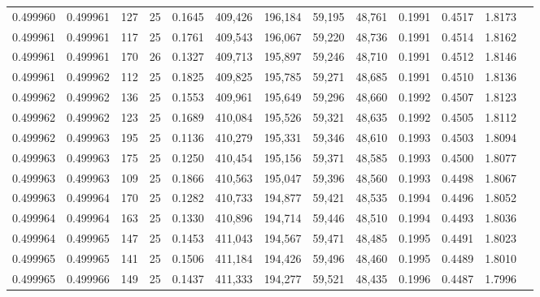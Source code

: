 \begin{tabular}{rrrrrrrrrrrrr}
0.499960 & 0.499961 & 127 &  25 &                                     0.1645 & 409,426 & 196,184 &  59,195 &  48,761 & 0.1991 & 0.4517 & 1.8173 \\
0.499961 & 0.499961 & 117 &  25 &                                     0.1761 & 409,543 & 196,067 &  59,220 &  48,736 & 0.1991 & 0.4514 & 1.8162 \\
0.499961 & 0.499961 & 170 &  26 &                                     0.1327 & 409,713 & 195,897 &  59,246 &  48,710 & 0.1991 & 0.4512 & 1.8146 \\
0.499961 & 0.499962 & 112 &  25 &                                     0.1825 & 409,825 & 195,785 &  59,271 &  48,685 & 0.1991 & 0.4510 & 1.8136 \\
0.499962 & 0.499962 & 136 &  25 &                                     0.1553 & 409,961 & 195,649 &  59,296 &  48,660 & 0.1992 & 0.4507 & 1.8123 \\
0.499962 & 0.499962 & 123 &  25 &                                     0.1689 & 410,084 & 195,526 &  59,321 &  48,635 & 0.1992 & 0.4505 & 1.8112 \\
0.499962 & 0.499963 & 195 &  25 &                                     0.1136 & 410,279 & 195,331 &  59,346 &  48,610 & 0.1993 & 0.4503 & 1.8094 \\
0.499963 & 0.499963 & 175 &  25 &                                     0.1250 & 410,454 & 195,156 &  59,371 &  48,585 & 0.1993 & 0.4500 & 1.8077 \\
0.499963 & 0.499963 & 109 &  25 &                                     0.1866 & 410,563 & 195,047 &  59,396 &  48,560 & 0.1993 & 0.4498 & 1.8067 \\
0.499963 & 0.499964 & 170 &  25 &                                     0.1282 & 410,733 & 194,877 &  59,421 &  48,535 & 0.1994 & 0.4496 & 1.8052 \\
0.499964 & 0.499964 & 163 &  25 &                                     0.1330 & 410,896 & 194,714 &  59,446 &  48,510 & 0.1994 & 0.4493 & 1.8036 \\
0.499964 & 0.499965 & 147 &  25 &                                     0.1453 & 411,043 & 194,567 &  59,471 &  48,485 & 0.1995 & 0.4491 & 1.8023 \\
0.499965 & 0.499965 & 141 &  25 &                                     0.1506 & 411,184 & 194,426 &  59,496 &  48,460 & 0.1995 & 0.4489 & 1.8010 \\
0.499965 & 0.499966 & 149 &  25 &                                     0.1437 & 411,333 & 194,277 &  59,521 &  48,435 & 0.1996 & 0.4487 & 1.7996 \\

\end{tabular}
